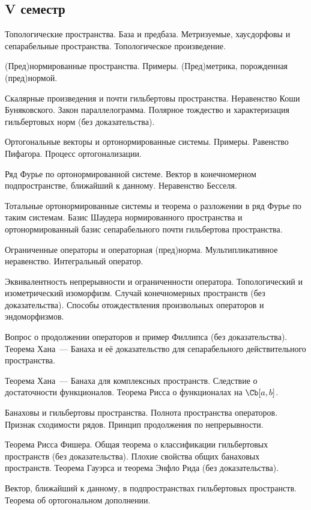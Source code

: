 \documentclass[a4paper]{article}
\begin{document}
\subsection*{V семестр}
\begin{nums}{-3}
\item Топологические пространства. База и предбаза. Метризуемые, хаусдорфовы и сепарабельные пространства.
Топологическое произведение.
\item (Пред)нормированные пространства. Примеры. (Пред)метрика, порожденная (пред)нормой.
\item Скалярные произведения и почти гильбертовы пространства. Неравенство Коши Буняковского. Закон параллелограмма.
Полярное тождество и характеризация гильбертовых норм (без доказательства).
\item Ортогональные векторы и ортонормированные системы. Примеры. Равенство Пифагора. Процесс ортогонализации.
\item Ряд Фурье по ортонормированной системе. Вектор в конечномерном подпространстве, ближайший к данному.
Неравенство Бесселя.
\item Тотальные ортонормированные системы и теорема о разложении в ряд Фурье по таким системам.
Базис Шаудера нормированного пространства и ортонормированный базис сепарабельного почти гильбертова пространства.
\item Ограниченные операторы и операторная (пред)норма. Мультипликативное неравенство. Интегральный оператор.
\item Эквивалентность непрерывности и ограниченности оператора. Топологический и изометрический изоморфизм.
Случай конечномерных пространств (без доказательства). Способы отождествления произвольных операторов и эндоморфизмов.
\item Вопрос о продолжении операторов и пример Филлипса (без доказательства). Теорема Хана~--- Банаха и её
доказательство для сепарабельного действительного пространства.
\item Теорема Хана~--- Банаха для комплексных пространств. Следствие о достаточности функционалов. Теорема
Рисса о функционалах на $\Cb[a,b]$.
\item Банаховы и гильбертовы пространства. Полнота пространства операторов. Признак сходимости рядов.
Принцип продолжения по непрерывности.
\item Теорема Рисса Фишера. Общая теорема о классификации гильбертовых пространств (без доказательства).
Плохие свойства общих банаховых пространств. Теорема Гауэрса и теорема Энфло Рида (без доказательства).
\item Вектор, ближайший к данному, в подпространствах гильбертовых пространств. Теорема об ортогональном дополнении.

\end{nums}
\end{document}

